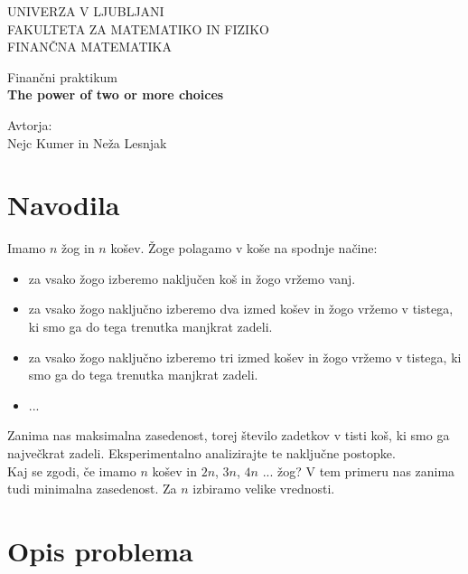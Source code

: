 \documentclass[a4paper, 11pt]{article}
\begin{document}
\begin{titlepage}
    \begin{center}
        \LARGE
        UNIVERZA V LJUBLJANI\\
        FAKULTETA ZA MATEMATIKO IN FIZIKO\\
        FINANČNA MATEMATIKA\\

        \vspace*{5cm}
        
        Finančni praktikum\\
        \huge
        \textbf{The power of two or more choices}

        \vspace*{6cm}

        \Large
        Avtorja:\\
        Nejc Kumer in Neža Lesnjak
    \end{center}
\end{titlepage}


\section{Navodila}

Imamo $n$ žog in $n$ košev. Žoge polagamo v koše na spodnje načine:

\begin{itemize}
    \item za vsako žogo izberemo naključen koš in žogo vržemo vanj.
    \item za vsako žogo naključno izberemo dva izmed košev in žogo vržemo v tistega, 
    ki smo ga do tega trenutka manjkrat zadeli.
    \item za vsako žogo naključno izberemo tri izmed košev in žogo vržemo v tistega, 
    ki smo ga do tega trenutka manjkrat zadeli.
    \item ...
\end{itemize}

Zanima nas maksimalna zasedenost, torej število zadetkov v tisti koš, ki smo ga največkrat zadeli.
Eksperimentalno analizirajte te naključne postopke.\\
Kaj se zgodi, če imamo $n$ košev in $2n$, $3n$, $4n$ ... žog?
V tem primeru nas zanima tudi minimalna zasedenost.
Za $n$ izbiramo velike vrednosti.

\section{Opis problema}
\end{document}
